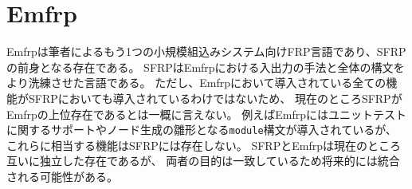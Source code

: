\section{Emfrp}
Emfrp\cite{sawada2016emfrp}は筆者によるもう1つの小規模組込みシステム向けFRP言語であり、SFRPの前身となる存在である。
SFRPはEmfrpにおける入出力の手法と全体の構文をより洗練させた言語である。
ただし、Emfrpにおいて導入されている全ての機能がSFRPにおいても導入されているわけではないため、
現在のところSFRPがEmfrpの上位存在であるとは一概に言えない。
例えばEmfrpにはユニットテストに関するサポートやノード生成の雛形となる\texttt{module}構文が導入されているが、
これらに相当する機能はSFRPには存在しない。
SFRPとEmfrpは現在のところ互いに独立した存在であるが、
両者の目的は一致しているため将来的には統合される可能性がある。
